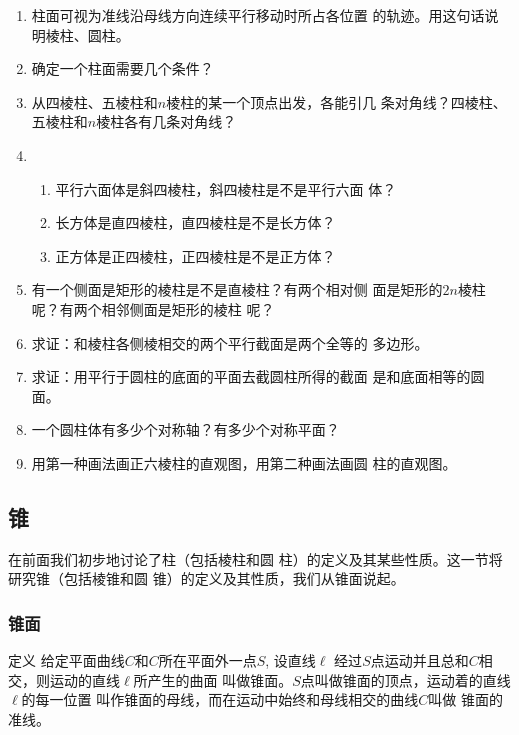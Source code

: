 \begin{ex}
\begin{enumerate}
    \item 柱面可视为准线沿母线方向连续平行移动时所占各位置
    的轨迹。用这句话说明棱柱、圆柱。
    \item 确定一个柱面需要几个条件？
    \item 从四棱柱、五棱柱和$n$棱柱的某一个顶点出发，各能引几
    条对角线？四棱柱、五棱柱和$n$棱柱各有几条对角线？
    \item \begin{enumerate}
    \item 平行六面体是斜四棱柱，斜四棱柱是不是平行六面
体？
\item 长方体是直四棱柱，直四棱柱是不是长方体？
\item 正方体是正四棱柱，正四棱柱是不是正方体？
    \end{enumerate} 

\item 有一个侧面是矩形的棱柱是不是直棱柱？有两个相对侧
面是矩形的$2n$棱柱呢？有两个相邻侧面是矩形的棱柱
呢？
\item 求证：和棱柱各侧棱相交的两个平行截面是两个全等的
多边形。
\item 求证：用平行于圆柱的底面的平面去截圆柱所得的截面
是和底面相等的圆面。
\item 一个圆柱体有多少个对称轴？有多少个对称平面？
\item 用第一种画法画正六棱柱的直观图，用第二种画法画圆
柱的直观图。
\end{enumerate}  
\end{ex}

\subsection{锥}

在前面我们初步地讨论了柱（包括棱柱和圆
柱）的定义及其某些性质。这一节将研究锥（包括棱锥和圆
锥）的定义及其性质，我们从锥面说起。

\subsubsection{锥面}

\begin{blk}
    {定义} 给定平面曲线$C$和$C$所在平面外一点$S$, 设直线$\ell$
经过$S$点运动并且总和$C$相交，则运动的直线$\ell$所产生的曲面
叫做锥面。$S$点叫做锥面的顶点，运动着的直线$\ell$的每一位置
叫作锥面的母线，而在运动中始终和母线相交的曲线$C$叫做
锥面的准线。
\end{blk}

